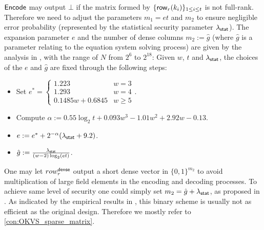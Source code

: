 ${\sf Encode}$ may output $\bot$ if the matrix formed by $\{{\sf row}_r(k_i)\}_{1\le i\le t}$ is not full-rank. Therefore we need to adjust the parameters $m_1=et$ and $m_2$ to ensure negligible error probability (represented by the statistical security parameter $\lambda_{\sf stat}$). The expansion parameter $e$ and the number of dense columns $m_2:=\hat{g}$ (where $\hat{g}$ is a parameter relating to the equation system solving process) are given by the analysis in \cite{cryptoeprint:2022/320}, with the range of $N$ from $2^6$ to $2^{18}$: Given $w$, $t$ and $\lambda_{\sf stat}$, the choices of the $e$ and $\hat{g}$ are fixed through the following steps: 
\begin{itemize}
  \item Set $e^* = \begin{cases}
    1.223 & w=3\\
    1.293 & w=4\\
    0.1485w+0.6845 & w\ge 5
  \end{cases}$.
  \item Compute $\alpha:=0.55 \log_2 t + 0.093w^3-1.01w^2 + 2.92w-0.13$.
  \item $e:=e^*+ 2^{-\alpha}(\lambda_{\sf stat}+9.2)$. 
  \item $\hat{g}:=\frac{\lambda_{\sf stat}}{(w-2)\log_2(et)}$. 
\end{itemize}



One may let $row_r^{\sf dense}$ output a short dense vector in $\{0,1\}^{m_2}$ to avoid multiplication of large field elements in the encoding and decoding processes. To achieve same level of security one could simply set $m_2=\hat{g}+\lambda_{\sf stat}$, as proposed in \cite{cryptoeprint:2021/883,cryptoeprint:2022/320}. As indicated by the empirical results in \cite{cryptoeprint:2022/320}, this binary scheme is usually not as efficient as the original design. Therefore we mostly refer to \cref{con:OKVS_sparse_matrix}. 

